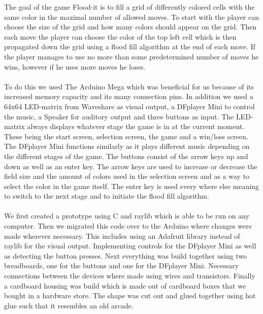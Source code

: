 \documentclass[10pt, a4paper]{article}
\begin{document}
The goal of the game Flood-it is to fill a grid of differently colored cells with the same color in the maximal number of allowed moves. To start with the player can choose the size of the grid and how many colors should appear on the grid. Then each move the player can choose the color of the top left cell which is then propagated down the grid using a flood fill algorithm at the end of each move. If the player manages to use no more than some predetermined number of moves he wins, however if he uses more moves he loses.\\\\
To do this we used The Arduino Mega which was beneficial for us because of its increased memory capacity and its many connection pins. In addition we used a 64x64 LED-matrix from Waveshare as visual output, a DFplayer Mini to control the music, a Speaker for auditory output and three buttons as input. The LED-matrix always displays whatever stage the game is in at the current moment. These being the start screen, selection screen, the game and a win/loss screen. The DFplayer Mini functions similarly as it plays different music depending on the different stages of the game. The buttons consist of the arrow keys up and down as well as an enter key. The arrow keys are used to increase or decrease the field size and the amount of colors used in the selection screen and as a way to select the color in the game itself. The enter key is used every where else meaning to switch to the next stage and to initiate the flood fill algorithm.\\\\
We first created a prototype using C and raylib which is able to be run on any computer. Then we migrated this code over to the Arduino where changes were made wherever necessary. This includes using an Adafruit library instead of raylib for the visual output. Implementing controls for the DFplayer Mini as well as detecting the button presses. Next everything was build together using two breadboards, one for the buttons and one for the DFplayer Mini. Necessary connections between the devices where made using wires and transistors. Finally a cardboard housing was build which is made out of cardboard boxes that we bought in a hardware store. The shape was cut out and glued together using hot glue such that it resembles an old arcade.
\end{document}
